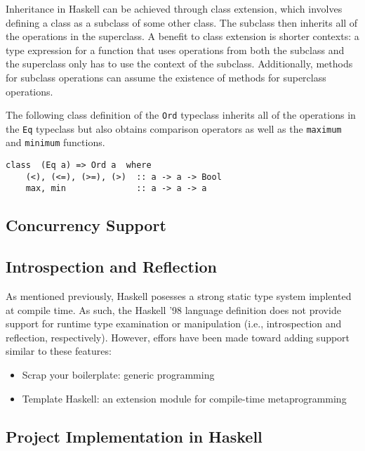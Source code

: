 \documentclass[titlepage,12pt]{article}
\newcommand{\bi}{\begin{itemize}}
\newcommand{\ei}{\end{itemize}}
\begin{document}
Inheritance in Haskell can be achieved through class extension, which involves defining a class as a subclass 
of some other class. The subclass then inherits all of the operations in the superclass. A benefit to class 
extension is shorter contexts: a type expression for a function that uses operations from both the subclass 
and the superclass only has to use the context of the subclass. Additionally, methods for subclass 
operations can assume the existence of methods for superclass operations.

The following class definition of the \texttt{Ord} typeclass inherits all of the operations in the \texttt{Eq} typeclass but
also obtains comparison operators as well as the \texttt{maximum} and \texttt{minimum} functions.

\begin{verbatim}
class  (Eq a) => Ord a  where
    (<), (<=), (>=), (>)  :: a -> a -> Bool
    max, min              :: a -> a -> a
\end{verbatim}

\subsection{Concurrency Support}


\subsection{Introspection and Reflection}

As mentioned previously, Haskell posesses a strong static type system
implented at compile time. As such, the Haskell '98 language definition
does not provide support for runtime type examination or manipulation
(i.e., introspection and reflection, respectively).  However, effors have been
made toward adding support similar to these features:
\bi
    \item Scrap your boilerplate: generic programming~\cite{haskell-syb}
    \item Template Haskell: an extension module for compile-time metaprogramming~\cite{haskell-th}
\ei


\newpage
\begin{appendices}
\section{Project Implementation in Haskell}
\inputminted{haskell}{src/InfixPostfix.hs}
\newpage
\inputminted{haskell}{src/InfixPostfixTest.hs}
\end{appendices}


\newpage


\end{document}
